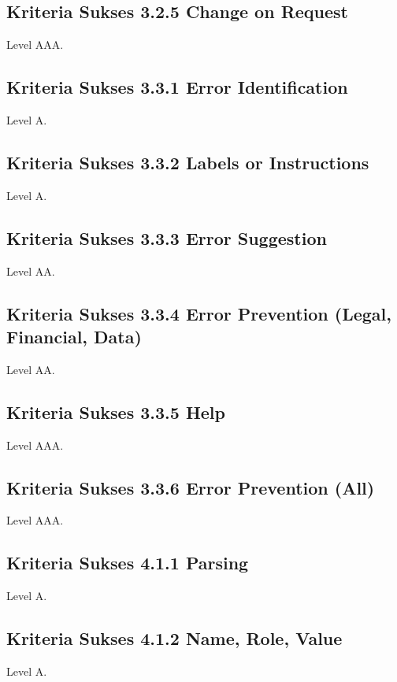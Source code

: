 \subsection{Kriteria Sukses 3.2.5 Change on Request}
\label{sec:kriteria_3.2.5}
Level AAA.

\subsection{Kriteria Sukses 3.3.1 Error Identification}
\label{sec:kriteria_3.3.1}
Level A.

\subsection{Kriteria Sukses 3.3.2 Labels or Instructions}
\label{sec:kriteria_3.3.2}
Level A.

\subsection{Kriteria Sukses 3.3.3 Error Suggestion}
\label{sec:kriteria_3.3.3}
Level AA.

\subsection{Kriteria Sukses 3.3.4 Error Prevention (Legal, Financial, Data)}
\label{sec:kriteria_3.3.4}
Level AA.

\subsection{Kriteria Sukses 3.3.5 Help}
\label{sec:kriteria_3.3.5}
Level AAA.

\subsection{Kriteria Sukses 3.3.6 Error Prevention (All)}
\label{sec:kriteria_3.3.6}
Level AAA.

\subsection{Kriteria Sukses 4.1.1 Parsing}
\label{sec:kriteria_4.1.1}
Level A.

\subsection{Kriteria Sukses 4.1.2 Name, Role, Value}
\label{sec:kriteria_4.1.2}
Level A.

